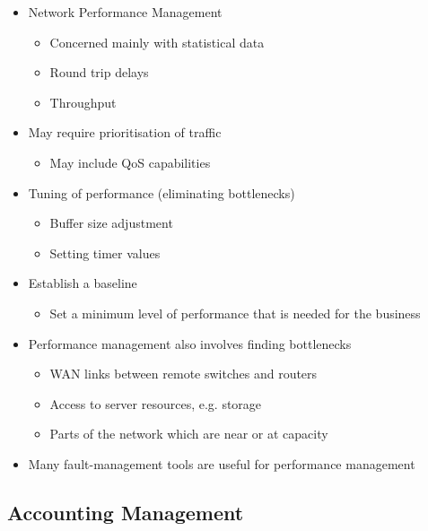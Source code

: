 \begin{itemize}
  \item Network Performance Management
  \begin{itemize}
    \item Concerned mainly with statistical data
    \item Round trip delays
    \item Throughput
  \end{itemize}
  \item May require prioritisation of traffic
  \begin{itemize}
    \item May include QoS capabilities
  \end{itemize}
  \item Tuning of performance (eliminating bottlenecks)
  \begin{itemize}
    \item Buffer size adjustment
    \item Setting timer values
  \end{itemize}
  \item Establish a baseline
  \begin{itemize}
    \item Set a minimum level of performance that is needed for the business
  \end{itemize}
  \item Performance management also involves finding bottlenecks
  \begin{itemize}
    \item WAN links between remote switches and routers
    \item Access to server resources, e.g. storage
    \item Parts of the network which are near or at capacity
  \end{itemize}
  \item Many fault-management tools are useful for performance management
\end{itemize}

\subsection*{Accounting Management}

